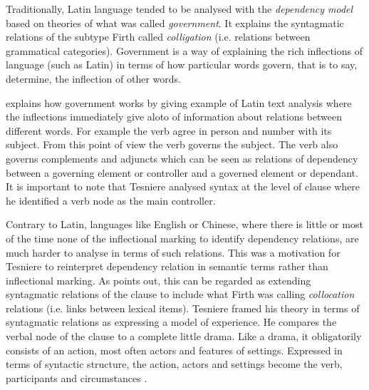 


%
%
%



Traditionally, Latin language tended to be analysed with the \textit{dependency model} based on theories of what was called \textit{government}. It explains the syntagmatic relations of the subtype Firth called \textit{colligation} (i.e. relations between grammatical categories). Government is a way of explaining the rich inflections of language (such as Latin) in terms of how particular words govern, that is to say, determine, the inflection of other words. \citep[p.66]{McDonald2008}

\citet{Tesniere2015} explains how government works by giving example of Latin text analysis where the inflections immediately give aloto of information about relations between different words. For example the verb agree in person and number with its subject. From this point of view the verb governs the subject. The verb also governs complements and adjuncts which can be seen as relations of dependency between a governing element or controller and a governed element or dependant. It is important to note that Tesniere analysed syntax at the level of clause where he identified a verb node as the main controller. 

Contrary to Latin, languages like English or Chinese, where there is little or most of the time none of the inflectional marking to identify dependency relations, are much harder to analyse in terms of such relations. This was a motivation for Tesniere to reinterpret dependency relation in semantic terms rather than inflectional marking. As \citet{McDonald2008} points out, this can be regarded as extending syntagmatic relations of the clause to include what Firth was calling \textit{collocation} relations (i.e. links between lexical items). Tesniere framed his theory in terms of syntagmatic relations as expressing a model of experience. He compares the verbal node of the clause to a complete little drama. Like a drama, it obligatorily consists of an action, most often actors and features of settings. Expressed in terms of syntactic structure, the action, actors and settings become the verb, participants and circumstances \citep{Tesniere2015}. 

